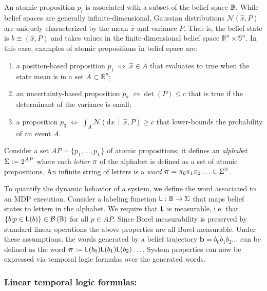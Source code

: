 \documentclass{ifacconf}
\begin{document}
An atomic proposition $p_i$ is associated with a subset of the belief space $\mathbb{B}$. While belief spaces are generally infinite-dimensional, Gaussian distributions $\mathcal N(\hat x, P)$ are uniquely characterized by the mean $\hat x$ and variance $P$. That is, the belief state is $b \equiv (\hat x, P)$ and takes values in the finite-dimensional belief space $\mathbb{R}^n \times \mathbb{S}^n$. In this case, examples of atomic propositions in belief space are:
\begin{enumerate}
  \item a position-based proposition $p_1 \; \Leftrightarrow \; \hat x \in A$ that evaluates to true when the state mean is in a set $A \subset \mathbb{R}^n$;
  \item an uncertainty-based proposition $p_2 \; \Leftrightarrow \det(P) \leq c$ that is true if the determinant of the variance is small;
  \item a proposition $p_3 \; \Leftrightarrow \; \int_{A} \mathcal N( \mathrm{d} x\, {\mid} \,\hat x, P) \geq c$ that lower-bounds the probability of an event $A$.
\end{enumerate}

Consider a set $AP = \{ p_1, \ldots, p_L \}$ of atomic propositions; it defines an \emph{alphabet} $\Sigma := 2^{AP}$ where each \emph{letter} $\pi$ of the alphabet is defined as a set of atomic propositions. An infinite string of letters is a \emph{word} ${\boldsymbol{\pi}}=\pi_0\pi_1\pi_2\ldots\in\Sigma^{\mathbb{N}}$.

To quantify the dynamic behavior of a system, we define the word associated to an MDP execution. Consider a labeling function $\mathsf{L}:\mathbb{B}\rightarrow \Sigma$ that maps belief states to letters in the alphabet. We require that $\mathsf{L}$ is measurable, i.e. that $\{b| p \in \mathsf{L}(b) \}\in \mathcal{B}\left(\mathbb{B}\right)$ for all $p \in AP$. Since Borel measurability is preserved by standard linear operations \citep{azoff1974borel} %
 the above properties are all Borel-measurable. Under these assumptions, the words generated by a belief trajectory $\mathbf{b} = b_0 b_1 b_2 \ldots$ can be defined as the word ${\boldsymbol{\pi}}:=\mathsf{L}(b_0)\mathsf{L}(b_1) \mathsf{L}(b_2) \ldots$. System properties can now be expressed via temporal logic formulas over the generated words.

\subsubsection{Linear temporal logic formulas:}
\end{document}
